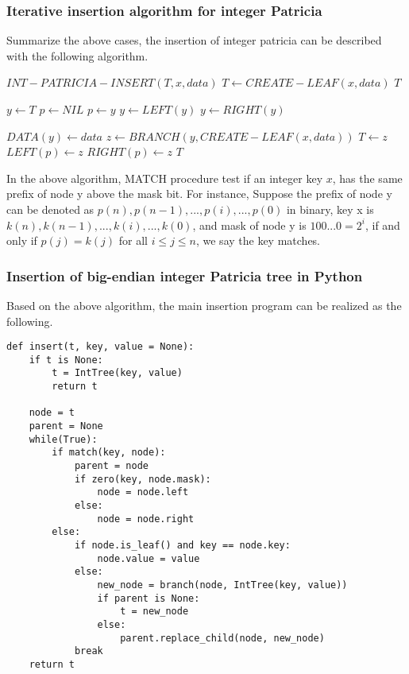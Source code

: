 \documentclass{article}
\begin{document}
\subsubsection{Iterative insertion algorithm for integer Patricia}

Summarize the above cases, the insertion of integer patricia can be described
with the following algorithm.

\begin{algorithmic}
\STATE $INT-PATRICIA-INSERT(T, x, data)$
   \STATE $T \leftarrow CREATE-LEAF(x, data)$
   \RETURN $T$
\ENDIF

\STATE $y \leftarrow T$
\STATE $p \leftarrow NIL$
  \STATE $p \leftarrow y$
    \STATE $y \leftarrow LEFT(y)$
  \ELSE
    \STATE $y \leftarrow RIGHT(y)$
  \ENDIF
\ENDWHILE

  \STATE $DATA(y) \leftarrow data$ 
\ELSE
  \STATE $z \leftarrow BRANCH(y, CREATE-LEAF(x, data))$
    \STATE $T \leftarrow z$
  \ELSE
      \STATE $LEFT(p) \leftarrow z$
    \ELSE
      \STATE $RIGHT(p) \leftarrow z$
    \ENDIF
  \ENDIF
\ENDIF
\RETURN $T$
\end{algorithmic}

In the above algorithm, MATCH procedure test if an integer key $x$, has 
the same prefix of node y above the mask bit. For instance,
Suppose the prefix of node y can be denoted as 
$p(n), p(n-1), ..., p(i), ..., p(0)$ in binary, key x is
$k(n), k(n-1), ..., k(i), ..., k(0)$, and mask of node y is 
$100...0=2^i$, if and only if $p(j)=k(j)$ for all $i \leq j \leq n$, 
we say the key matches.

\subsubsection*{Insertion of big-endian integer Patricia tree in Python}

Based on the above algorithm, the main insertion program can be realized 
as the following.

\begin{lstlisting}
def insert(t, key, value = None):
    if t is None:
        t = IntTree(key, value)
        return t

    node = t
    parent = None
    while(True):
        if match(key, node):
            parent = node
            if zero(key, node.mask):
                node = node.left
            else:
                node = node.right
        else:
            if node.is_leaf() and key == node.key:
                node.value = value
            else:
                new_node = branch(node, IntTree(key, value))
                if parent is None:
                    t = new_node
                else:
                    parent.replace_child(node, new_node)
            break
    return t
\end{lstlisting}
\end{document}
